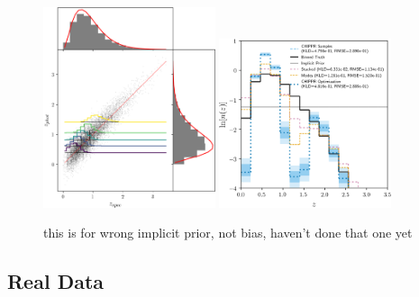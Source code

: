 
\begin{figure}
	\begin{center}
		\includegraphics[width=0.45\textwidth]{figures/chippr/wrong_scatter.png}
		\includegraphics[width=0.45\textwidth]{figures/chippr/wrong_log_estimators.png}
		\caption{this is for wrong implicit prior, not bias, haven't done that one yet}
	\end{center}
\end{figure}

\subsection{Real Data}


